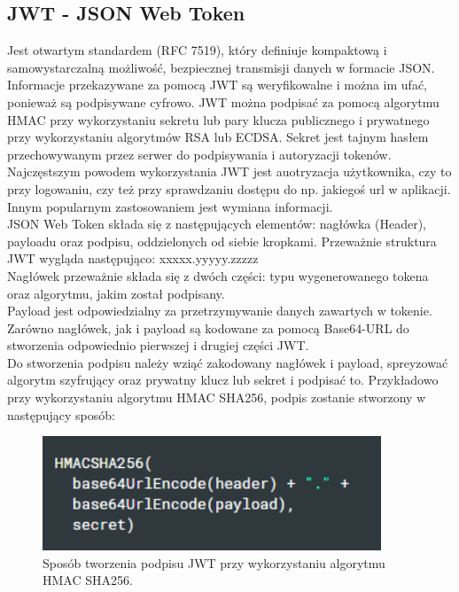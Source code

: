 \documentclass[12pt]{article}
\begin{document}
\begin{sloppypar}
{  \subsection{JWT - JSON Web Token}
  {
    Jest otwartym standardem (RFC 7519), który definiuje kompaktową i samowystarczalną możliwość, bezpiecznej transmisji danych w formacie JSON\cite{jwt}. 
    Informacje przekazywane za pomocą JWT są weryfikowalne i można im ufać, ponieważ są podpisywane cyfrowo. 
    JWT można podpisać za pomocą algorytmu HMAC przy wykorzystaniu sekretu lub pary klucza publicznego i prywatnego przy wykorzystaniu algorytmów RSA lub ECDSA. 
    Sekret jest tajnym hasłem przechowywanym przez serwer do podpisywania i autoryzacji tokenów.
    Najczęstszym powodem wykorzystania JWT jest auotryzacja użytkownika, czy to przy logowaniu, czy też 
    przy sprawdzaniu dostępu do np. jakiegoś url w aplikacji. Innym popularnym zastosowaniem jest wymiana informacji.\\
    JSON Web Token składa się z następujących elementów: nagłówka (Header), payloadu oraz podpisu, oddzielonych od siebie kropkami. 
    Przeważnie struktura JWT wygląda następująco: xxxxx.yyyyy.zzzzz\\
    Nagłówek przeważnie składa się z dwóch części: typu wygenerowanego tokena oraz algorytmu, jakim został podpisany.\\
    Payload jest odpowiedzialny za przetrzymywanie danych zawartych w tokenie.\\
    Zarówno nagłówek, jak i payload są kodowane za pomocą Base64-URL do stworzenia odpowiednio pierwszej i drugiej części JWT.\\
    Do stworzenia podpisu należy wziąć zakodowany nagłówek i payload, spreyzować algorytm szyfrujący oraz prywatny klucz lub sekret i podpisać to.
    Przykładowo przy wykorzystaniu algorytmu HMAC SHA256, podpis zostanie stworzony w następujący sposób:\\
    \begin{figure}[H]
      \centering
      \includegraphics[width=0.9\textwidth]{JWT_signature.PNG}
      \caption{Sposób tworzenia podpisu JWT przy wykorzystaniu algorytmu HMAC SHA256.}

\end{figure}}}
\end{sloppypar}
\end{document}
